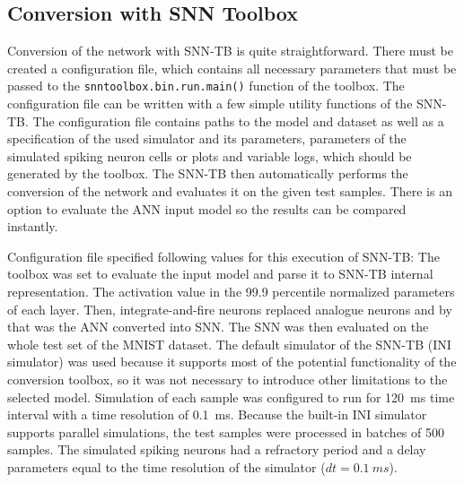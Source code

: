 \subsection{Conversion with SNN Toolbox}
Conversion of the network with SNN-TB is quite straightforward. There must be created a configuration file, which contains all necessary parameters that must be passed to the \texttt{snntoolbox.bin.run.main()} function of the toolbox. The configuration file can be written with a few simple utility functions of the SNN-TB. The configuration file contains paths to the model and dataset as well as a specification of the used simulator and its parameters, parameters of the simulated spiking neuron cells or plots and variable logs, which should be generated by the toolbox. The SNN-TB then automatically performs the conversion of the network and evaluates it on the given test samples. There is an option to evaluate the ANN input model so the results can be compared instantly. \par
Configuration file specified following values for this execution of SNN-TB: The  toolbox was set to evaluate the input model and parse it to SNN-TB internal representation. The activation value in the 99.9 percentile normalized parameters of each layer. Then, integrate-and-fire neurons replaced analogue neurons and by that was the ANN converted into SNN. The SNN was then evaluated on the whole test set of the MNIST dataset. The default simulator of the SNN-TB (INI simulator) was used because it supports most of the potential functionality of the conversion toolbox, so it was not necessary to introduce other limitations to the selected model. Simulation of each sample was configured to run for 120~ms time interval with a time resolution of 0.1~ms. Because the built-in INI simulator supports parallel simulations, the test samples were processed in batches of 500 samples. The simulated spiking neurons had a refractory period and a delay parameters equal to the time resolution of the simulator ($dt=0.1~ms$).\par


